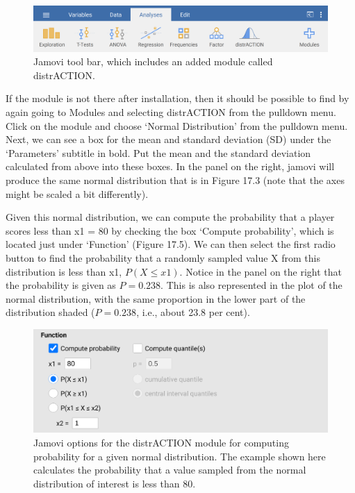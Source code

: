 \documentclass[
  openany]{krantz}
\begin{document}
\begin{figure}
\includegraphics[width=1\linewidth]{img/jamovi_toolbar_modules_distrACTION} \caption{Jamovi tool bar, which includes an added module called distrACTION.}\label{fig:unnamed-chunk-68}
\end{figure}

If the module is not there after installation, then it should be possible to find by again going to Modules and selecting distrACTION from the pulldown menu.
Click on the module and choose `Normal Distribution' from the pulldown menu.
Next, we can see a box for the mean and standard deviation (SD) under the `Parameters' subtitle in bold.
Put the mean and the standard deviation calculated from above into these boxes.
In the panel on the right, jamovi will produce the same normal distribution that is in Figure 17.3 (note that the axes might be scaled a bit differently).

Given this normal distribution, we can compute the probability that a player scores less than x1 = 80 by checking the box `Compute probability', which is located just under `Function' (Figure 17.5).
We can then select the first radio button to find the probability that a randomly sampled value X from this distribution is less than x1, \(P(X \leq x1)\).
Notice in the panel on the right that the probability is given as \(P = 0.238\).
This is also represented in the plot of the normal distribution, with the same proportion in the lower part of the distribution shaded (\(P = 0.238\), i.e., about 23.8 per cent).

\begin{figure}
\includegraphics[width=0.8\linewidth]{img/jamovi_normal_distribution} \caption{Jamovi options for the distrACTION module for computing probability for a given normal distribution. The example shown here calculates the probability that a value sampled from the normal distribution of interest is less than 80.}\label{fig:unnamed-chunk-69}
\end{figure}
\end{document}

